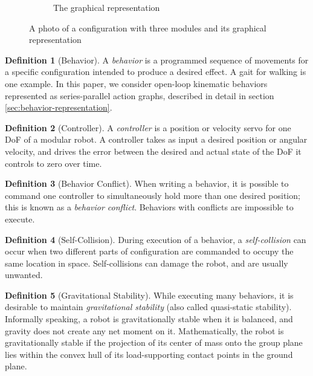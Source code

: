 \documentclass[conference]{IEEEtran}
\theoremstyle{definition}
\newtheorem{definition}{Definition}[section]
\begin{document}
\begin{figure}
\begin{center}
\begin{subfigure}[b]{0.4\columnwidth}
                \caption{The graphical representation}
                \label{fig:smores_conf_graph}
        \end{subfigure}
\end{center}
\caption{A photo of a configuration with three modules and its graphical representation}
\label{fig:smores_conf}
\end{figure}



\begin{definition}[Behavior]\label{def:behavior}
A \textit{behavior} is a programmed sequence of movements for a specific configuration
intended to produce a desired effect.  A gait for walking is one example.  In
this paper, we consider open-loop kinematic behaviors represented as
series-parallel action graphs, described in detail in section
\ref{sec:behavior-representation}.
\end{definition}
\begin{definition}[Controller]
A \textit{controller} is a position or velocity servo for one DoF of a modular
robot.  A controller takes as input a desired position or angular velocity, and
drives the error between the desired and actual state of the DoF it controls to
zero over time.
\end{definition}
\begin{definition}[Behavior Conflict]
When writing a behavior, it is possible to command one controller to
simultaneously hold more than one desired position; this is known as a
\textit{behavior conflict}.  Behaviors with conflicts are
impossible to execute.
\end{definition}
\begin{definition}[Self-Collision]
During execution of a behavior, a \textit{self-collision} can occur when two
different parts of configuration are commanded to occupy the same location in
space.  Self-collisions can damage the robot, and are usually unwanted.
\end{definition}
\begin{definition}[Gravitational Stability]
While executing many behaviors, it is desirable to maintain \textit{gravitational
stability} (also called quasi-static stability).  Informally speaking, a
robot is gravitationally stable when it is balanced, and gravity does not
create any net moment on it.  Mathematically, the robot is gravitationally stable
if the projection of its center of
mass onto the group plane lies within the convex hull of its load-supporting contact points in the
ground plane.
\end{definition}
\end{document}
